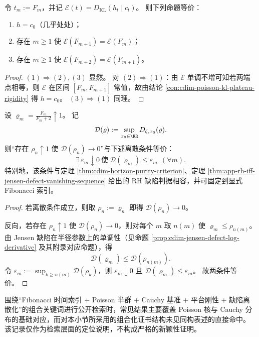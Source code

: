\begin{conclusion}\label{con:cdim-fibonacci-kl-platform-finite-certificate}
令 \(t_m:=F_m\)，并记 \(\mathcal E(t)=D_{\mathrm{KL}}(h_t\mid c_t)\)。
则下列命题等价：
\begin{enumerate}
  \item \(h=c_0\)（几乎处处）；
  \item 存在 \(m\ge 1\) 使 \(\mathcal E(F_{m+1})=\mathcal E(F_m)\)；
  \item 存在 \(m\ge 1\) 使 \(\mathcal E(F_{m+2})=\mathcal E(F_{m+1})\)。
\end{enumerate}
\end{conclusion}
\begin{proof}
\((1)\Rightarrow(2),(3)\) 显然。
对 \((2)\Rightarrow(1)\)：由 \(\mathcal E\) 单调不增可知若两端点相等，则 \(\mathcal E\) 在区间 \([F_m,F_{m+1}]\) 常值，故由结论 \ref{con:cdim-poisson-kl-plateau-rigidity} 得 \(h=c_0\)。
\((3)\Rightarrow(1)\) 同理。
\end{proof}

\begin{conclusion}\label{con:cdim-rh-defect-fibonacci-discretization}
设 \(\varrho_m=\frac{F_m}{F_m+2}\uparrow 1\)。
记
\[
\mathcal D(\varrho):=\sup_{x_0\in\RR}D_{\zeta,x_0}(\varrho).
\]
则“存在 \(\rho_n\uparrow 1\) 使 \(\mathcal D(\rho_n)\to 0\)”与下述离散条件等价：
\[
\exists\,\varepsilon_m\downarrow 0\ \text{使}\ \mathcal D(\varrho_m)\le \varepsilon_m\ \ (\forall m).
\]
特别地，该条件与定理 \ref{thm:cdim-horizon-purity-criterion}、定理 \ref{thm:app-rh-iff-jensen-defect-vanishing-sequence} 给出的 RH 缺陷判据相容，并可固定到显式 Fibonacci 索引。
\end{conclusion}
\begin{proof}
若离散条件成立，则取 \(\rho_n:=\varrho_n\) 即得 \(\mathcal D(\rho_n)\to 0\)。

反向，若存在 \(\rho_n\uparrow 1\) 使 \(\mathcal D(\rho_n)\to 0\)，则对每个 \(m\) 取 \(n(m)\) 使 \(\varrho_m\le \rho_{n(m)}\)。
由 Jensen 缺陷在半径参数上的单调性（见命题 \ref{prop:cdim-jensen-defect-log-derivative} 及其附录对应命题），得
\[
\mathcal D(\varrho_m)\le \mathcal D(\rho_{n(m)}).
\]
令 \(\varepsilon_m:=\sup_{k\ge n(m)}\mathcal D(\rho_k)\)，则 \(\varepsilon_m\downarrow 0\) 且 \(\mathcal D(\varrho_m)\le\varepsilon_m\)。
故两条件等价。
\end{proof}

\begin{remark}[检索定位说明]\label{rem:cdim-fibonacci-poisson-kl-rh-search-note}
围绕“Fibonacci 时间索引 + Poisson 半群 + Cauchy 基准 + 平台刚性 + 缺陷离散化”的组合关键词进行公开检索时，常见结果主要覆盖 Poisson 核与 Cauchy 分布的基础对应，而对本小节所采用的组合化证书结构未见同构表述的直接命中。
该记录仅作为检索层面的定位说明，不构成严格的新颖性证明。
\end{remark}


